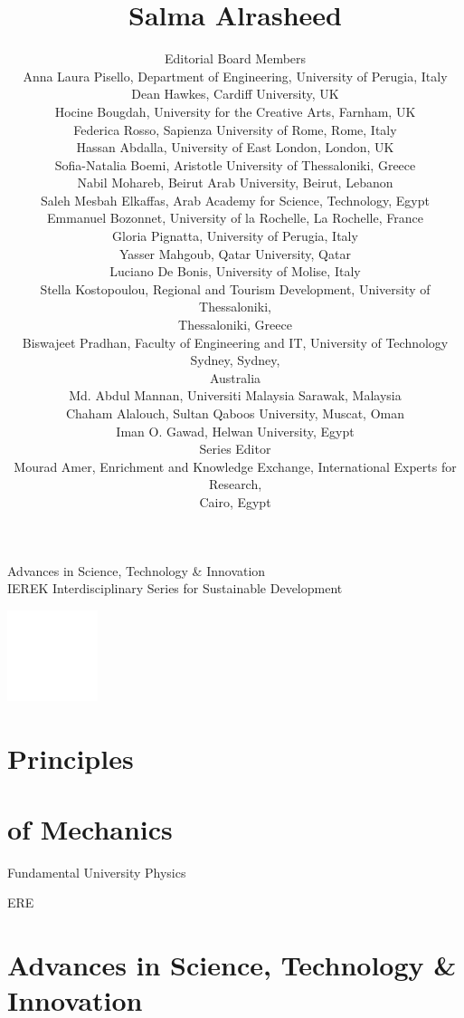 \documentclass[10pt]{article}
\title{Salma Alrasheed }
\author{Editorial Board Members\\
Anna Laura Pisello, Department of Engineering, University of Perugia, Italy\\
Dean Hawkes, Cardiff University, UK\\
Hocine Bougdah, University for the Creative Arts, Farnham, UK\\
Federica Rosso, Sapienza University of Rome, Rome, Italy\\
Hassan Abdalla, University of East London, London, UK\\
Sofia-Natalia Boemi, Aristotle University of Thessaloniki, Greece\\
Nabil Mohareb, Beirut Arab University, Beirut, Lebanon\\
Saleh Mesbah Elkaffas, Arab Academy for Science, Technology, Egypt\\
Emmanuel Bozonnet, University of la Rochelle, La Rochelle, France\\
Gloria Pignatta, University of Perugia, Italy\\
Yasser Mahgoub, Qatar University, Qatar\\
Luciano De Bonis, University of Molise, Italy\\
Stella Kostopoulou, Regional and Tourism Development, University of Thessaloniki,\\
Thessaloniki, Greece\\
Biswajeet Pradhan, Faculty of Engineering and IT, University of Technology Sydney, Sydney,\\
Australia\\
Md. Abdul Mannan, Universiti Malaysia Sarawak, Malaysia\\
Chaham Alalouch, Sultan Qaboos University, Muscat, Oman\\
Iman O. Gawad, Helwan University, Egypt\\
Series Editor\\
Mourad Amer, Enrichment and Knowledge Exchange, International Experts for Research,\\
Cairo, Egypt}
\date{}
\begin{document}
\maketitle
Advances in Science, Technology \& Innovation\\
IEREK Interdisciplinary Series for Sustainable Development

\begin{center}
\includegraphics[max width=\textwidth]{image-not-found}
\end{center}

\section*{Principles}
\section*{of Mechanics}
Fundamental University Physics

ERE

\section*{Advances in Science, Technology \& Innovation }
\end{document}
